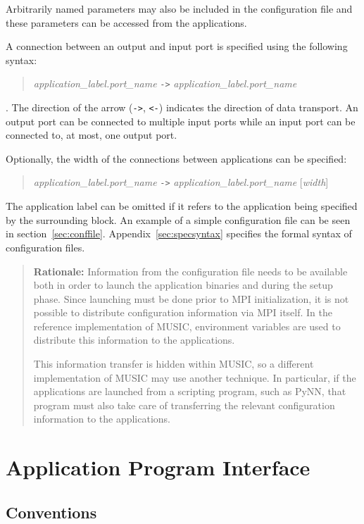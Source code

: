 \documentclass[a4paper]{report}
\newenvironment{rationale}%
{\par\begin{quote}\textbf{Rationale:}}%
{\par\end{quote}}
\begin{document}
Arbitrarily named parameters may also be included in the configuration
file and these parameters can be accessed from the applications.

A connection between an output and input port is specified using the
following syntax:
\begin{quote}
  \emph{application\_label.port\_name} \lstinline|->| \emph{application\_label.port\_name}
\end{quote}
\noindent.  The direction of the arrow (\lstinline|->|, \lstinline|<-|) indicates the
direction of data transport.  An output port can be connected to
multiple input ports while an input port can be connected to, at most,
one output port.

Optionally, the width of the connections between applications can be
specified:
\begin{quote}
  \emph{application\_label.port\_name} \lstinline|->|
  \emph{application\_label.port\_name} [\emph{width}]
\end{quote}
The application label can be omitted if it refers to the application
being specified by the surrounding block.
An example of a simple configuration file can be seen in
section~\ref{sec:conffile}.  Appendix~\ref{sec:specsyntax} specifies
the formal syntax of configuration files.

\begin{rationale}
  Information from the configuration file needs to be available both
  in order to launch the application binaries and during the setup
  phase.  Since launching must be done prior to MPI initialization, it
  is not possible to distribute configuration information via MPI
  itself.  In the reference implementation of MUSIC, environment
  variables are used to distribute this information to the
  applications.

  This information transfer is hidden within MUSIC, so a different
  implementation of MUSIC may use another technique.  In particular,
  if the applications are launched from a scripting program, such as
  PyNN, that program must also take care of transferring
  the relevant configuration information to the applications.
\end{rationale}


\chapter{Application Program Interface}

\section{Conventions}
\end{document}
